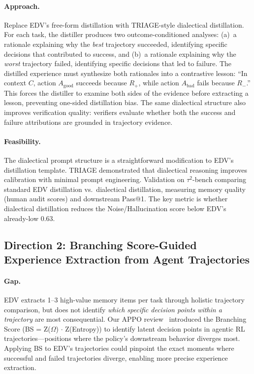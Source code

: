 \documentclass[11pt,a4paper]{article}
\begin{document}
\paragraph{Approach.} Replace EDV's free-form distillation with TRIAGE-style dialectical distillation. For each task, the distiller produces two outcome-conditioned analyses: (a)~a rationale explaining why the \emph{best} trajectory succeeded, identifying specific decisions that contributed to success, and (b)~a rationale explaining why the \emph{worst} trajectory failed, identifying specific decisions that led to failure. The distilled experience must synthesize both rationales into a contrastive lesson: ``In context $C$, action $A_{\mathrm{good}}$ succeeds because $R_+$, while action $A_{\mathrm{bad}}$ fails because $R_-$.'' This forces the distiller to examine both sides of the evidence before extracting a lesson, preventing one-sided distillation bias. The same dialectical structure also improves verification quality: verifiers evaluate whether both the success and failure attributions are grounded in trajectory evidence.

\paragraph{Feasibility.} The dialectical prompt structure is a straightforward modification to EDV's distillation template. TRIAGE demonstrated that dialectical reasoning improves calibration with minimal prompt engineering. Validation on $\tau^2$-bench comparing standard EDV distillation vs.\ dialectical distillation, measuring memory quality (human audit scores) and downstream Pass@1. The key metric is whether dialectical distillation reduces the Noise/Hallucination score below EDV's already-low 0.63.

\subsection{Direction 2: Branching Score-Guided Experience Extraction from Agent Trajectories}

\paragraph{Gap.} EDV extracts 1--3 high-value memory items per task through holistic trajectory comparison, but does not identify \emph{which specific decision points within a trajectory} are most consequential. Our APPO review~\cite{wang2026appo} introduced the Branching Score (BS = Z($\Omega$) $\cdot$ Z(Entropy)) to identify latent decision points in agentic RL trajectories---positions where the policy's downstream behavior diverges most. Applying BS to EDV's trajectories could pinpoint the exact moments where successful and failed trajectories diverge, enabling more precise experience extraction.
\end{document}
